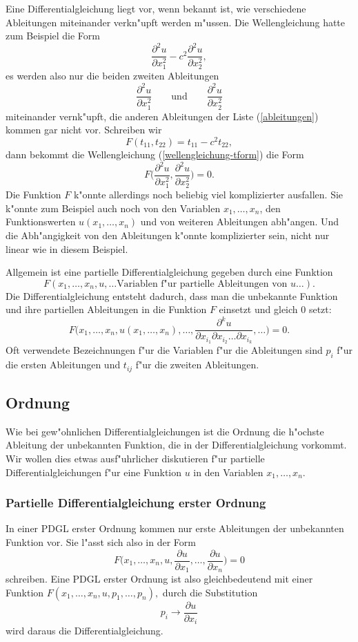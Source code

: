 Eine Differentialgleichung liegt vor, wenn bekannt ist, wie verschiedene
Ableitungen miteinander verkn"upft werden m"ussen.
Die Wellengleichung hatte zum Beispiel die Form
\begin{equation}
\frac{\partial^2 u}{\partial x_1^2}
-
c^2\frac{\partial^2 u}{\partial x_2^2},
\label{wellengleichung-tform}
\end{equation}
es werden also nur die beiden zweiten Ableitungen
\[
\frac{\partial^2 u}{\partial x_1^2}
\qquad
\text{und}
\qquad
\frac{\partial^2 u}{\partial x_2^2}
\]
miteinander vernk"upft, die anderen Ableitungen der Liste
(\ref{ableitungen}) kommen gar nicht vor.
Schreiben wir
\[
F(t_{11}, t_{22}) = t_{11} -c^2t_{22},
\]
dann bekommt die Wellengleichung (\ref{wellengleichung-tform})
die Form
\[
F\biggl(
\frac{\partial^2 u}{\partial x_1^2},
\frac{\partial^2 u}{\partial x_2^2}
\biggr)=0.
\]
Die Funktion $F$ k"onnte allerdings noch beliebig viel komplizierter
ausfallen.
Sie k"onnte zum Beispiel auch noch von den Variablen $x_1,\dots,x_n$,
den Funktionswerten $u(x_1,\dots,x_n)$ und von weiteren Ableitungen
abh"angen.
Und die Abh"angigkeit von den Ableitungen k"onnte komplizierter sein,
nicht nur linear wie in diesem Beispiel.

Allgemein ist eine partielle Differentialgleichung gegeben
durch eine Funktion
\[
F(x_1,\dots,x_n,u,\dots\text{Variablen f"ur partielle Ableitungen von $u$}\dots).
\]
Die Differentialgleichung
entsteht dadurch, dass man die unbekannte Funktion
und ihre partiellen Ableitungen in die Funktion $F$ einsetzt und
gleich $0$ setzt:
\[
F\biggl(x_1,\dots,x_n,u(x_1,\dots,x_n),\dots,
\frac{\partial^k u}{\partial x_{i_1}\partial x_{i_2}\dots \partial x_{i_k}},\dots\biggr)=0.
\]
Oft verwendete Bezeichnungen f"ur die Variablen f"ur die Ableitungen sind
$p_i$ f"ur die ersten Ableitungen und $t_{ij}$ f"ur die zweiten Ableitungen.


\subsection{Ordnung\label{klassifikation:ordnung}}
Wie bei gew"ohnlichen Differentialgleichungen ist die Ordnung
die h"ochste Ableitung der unbekannten Funktion, die in der
Differentialgleichung vorkommt. Wir wollen dies etwas ausf"uhrlicher
diskutieren f"ur partielle Differentialgleichungen f"ur eine Funktion
$u$ in den Variablen $x_1,\dots,x_n$.

\subsubsection{Partielle Differentialgleichung erster Ordnung}
In einer PDGL erster Ordnung kommen nur erste Ableitungen der
unbekannten Funktion vor.
Sie l"asst sich also in der Form 
\[
F\biggl(x_1,\dots,x_n, u, \frac{\partial u}{\partial x_1},\dots,\frac{\partial u}{\partial x_n}\biggr)=0
\]
schreiben. Eine PDGL erster Ordnung ist also gleichbedeutend mit einer
Funktion 
$F(x_1,\dots,x_n,u,p_1,\dots,p_n),$
durch die Substitution
\[
p_i\to \frac{\partial u}{\partial x_i}
\]
wird daraus die Differentialgleichung.

